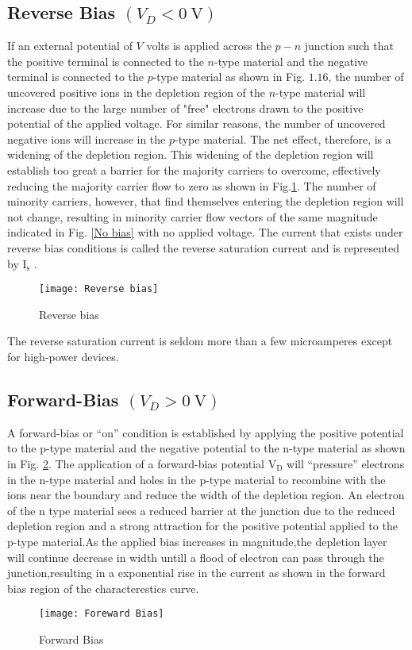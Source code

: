 \subsection{Reverse Bias $\left(V_{D}<0 \mathrm{~V}\right)$}
If an external potential of $V$ volts is applied across the $p-n$ junction such that the positive terminal is connected to the $n$-type material and the negative terminal is connected to the $p$-type material as shown in Fig. $1.16$, the number of uncovered positive ions in the depletion region of the $n$-type material will increase due to the large number of "free" electrons drawn to the positive potential of the applied voltage. For similar reasons, the number of uncovered negative ions will increase in the $p$-type material. The net effect, therefore, is a widening of the depletion region. This widening of the depletion region will establish too great a barrier for the majority carriers to overcome, effectively reducing the majority carrier flow to zero as shown in Fig.\ref{Reverse bias}. The number of minority carriers, however, that find themselves entering the depletion region will not change, resulting in minority carrier flow vectors of the same magnitude indicated in Fig. \ref{No bias} with no applied voltage.
The current that exists under reverse bias conditions is called the reverse saturation current and is represented by $\mathrm{I_s}$ .
\begin{figure}[H]
	\centering
	\texttt{[image: Reverse bias]}
	\caption{Reverse bias}
	\label{Reverse bias}
\end{figure}
The reverse saturation current is seldom more than a few microamperes except for high-power devices.
\subsection{Forward-Bias  $\left(V_{D}>0 \mathrm{~V}\right)$}
A forward-bias or “on” condition is established by applying the positive potential to the p-type material and the negative potential to the n-type material as shown in Fig. \ref{Forward Bias}. The application of a forward-bias potential $\mathrm{V_D}$ will “pressure” electrons in the n-type material and holes in the p-type material to recombine with the ions near the boundary and reduce the width of the depletion region. An electron of the n type material sees a reduced barrier at the junction due to the reduced depletion region and a strong attraction for the positive potential applied to the p-type material.As the applied bias increases in magnitude,the depletion layer will continue decrease in width untill a flood of electron can pass through the junction,resulting in a exponential rise in the current as shown in the forward bias region of the characterestics curve.
\begin{figure}[H]
	\centering
	\texttt{[image: Foreward Bias]}
	\caption{Forward Bias}
	\label{Forward Bias}
\end{figure}
